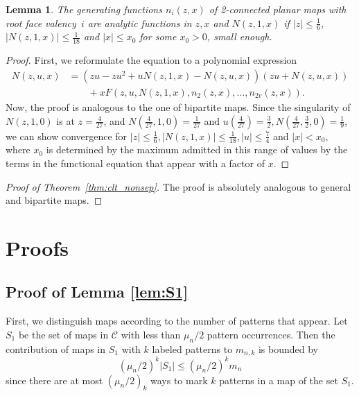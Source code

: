 \documentclass[reqno, 11pt]{amsart}
\newtheorem{lemma}{Lemma}
\theoremstyle{definition}
\theoremstyle{remark}
\numberwithin{equation}{section}
\begin{document}
\begin{lemma}\label{lem:nonsep_ana}
    The generating functions $n_i(z,x)$ of 2-connected planar maps with root face valency~$i$ are analytic functions in $z,x$ and $N(z,1,x)$ if $|z|\leq \frac{1}{6}$, $|N(z,1,x)| \leq \frac{1}{18}$ and $|x| \leq x_0$ for some $x_0>0$, small enough.
\end{lemma}

\begin{proof}
    First, we reformulate the equation to a polynomial expression
    \begin{align*}
        N(z,u,x) &= \left(zu-zu^2+uN(z,1,x)-N(z,u,x)\right)(zu+N(z,u,x)) \\
        &\qquad + xF(z,u,N(z,1,x),n_2(z,x),\dots, n_{2v}(z,x)).
    \end{align*}
    Now, the proof is analogous to the one of bipartite maps. Since the singularity of $N(z,1,0)$ is at $z=\frac{4}{27}$, and $N(\frac{4}{27},1,0)=\frac{1}{27}$ and $u(\frac{4}{27})=\frac{3}{2}, N(\frac{4}{27},\frac{3}{2},0) = \frac{1}{9}$, we can show convergence for $|z|\leq \frac{1}{6}, |N(z,1,x)|\leq \frac{1}{18}, |u|\leq \frac{7}{4}$ and $|x|<x_0$, where $x_0$ is determined by the maximum admitted in this range of values by the terms in the functional equation that appear with a factor of $x$.
\end{proof}

\begin{proof}[Proof of Theorem~\ref{thm:clt_nonsep}]
The proof is absolutely analogous to general and bipartite maps.
\end{proof}

\section{Proofs}\label{sec:proofs}

\subsection{Proof of Lemma \ref{lem:S1}}

First, we distinguish maps according to the number of patterns that appear. Let $S_1$ be the set of maps in $\mathcal{C}$ with less than $\mu_n/2$ pattern occurrences. Then the contribution of maps in $S_1$ with $k$ labeled patterns to $m_{n,k}$ is bounded by
\[
    (\mu_n/2)^k|S_1| \leq (\mu_n/2)^km_n
\] 
since there are at most $(\mu_n/2)_k$ ways to mark $k$ patterns in a map of the set $S_1$.
\end{document}
